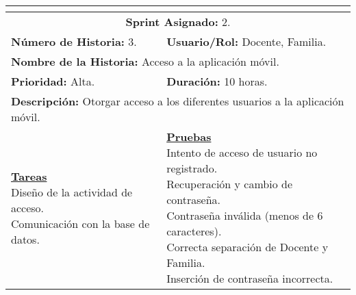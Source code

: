 \begin{tabular}{|l|l|}
	\hline
	\multicolumn{2}{|c|}{\cellcolor[HTML]{343434}{\color[HTML]{FFFFFF} \textbf{Historia de Usuario}}} \\
	\hline
	\multicolumn{2}{|c|}{\textbf{Sprint Asignado:} 2.} \\
	\hline
	\textbf{Número de Historia:} 3. & \textbf{Usuario/Rol:} Docente, Familia.\\
	\hline
	\multicolumn{2}{|l|}{\textbf{Nombre de la Historia:} Acceso a la aplicación móvil.} \\
	\hline
	\textbf{Prioridad:} Alta. & \textbf{Duración:} 10 horas.\\
	\hline
	\multicolumn{2}{|l|}{\textbf{Descripción:} Otorgar acceso a los diferentes usuarios a la aplicación móvil.} \\
	\hline
	\specialcell{\underline{\textbf{Tareas}} \\ Diseño de la actividad de acceso. \\ Comunicación con la base de datos.} & \specialcell{\underline{\textbf{Pruebas}} \\ Intento de acceso de usuario no registrado. \\ Recuperación y cambio de contraseña. \\ Contraseña inválida (menos de 6 caracteres). \\ Correcta separación de Docente y Familia. \\ Inserción de contraseña incorrecta.} \\
	\hline
\end{tabular}

